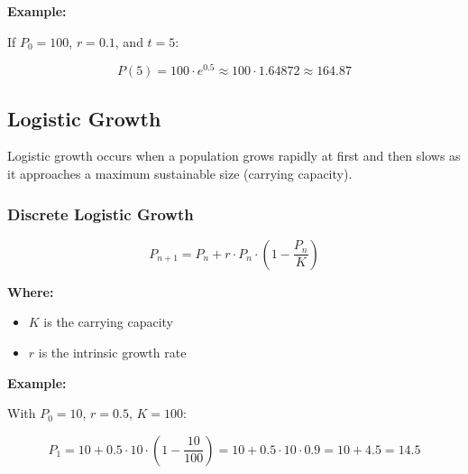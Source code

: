 \textbf{Example:}
\vspace{\baselineskip}
  
If \(P_0 = 100\), \(r = 0.1\), and \(t = 5\):

\[
P(5) = 100 \cdot e^{0.5} \approx 100 \cdot 1.64872 \approx 164.87
\]

\begin{center}
\end{center}

\subsection{Logistic Growth}

Logistic growth occurs when a population grows rapidly at first and then slows as it approaches a maximum sustainable size (carrying capacity).

\subsubsection{Discrete Logistic Growth}

\[
P_{n+1} = P_n + r \cdot P_n \cdot \left(1 - \frac{P_n}{K}\right)
\]

\textbf{Where:}
\begin{itemize}[label=\(-\)]
  \item \(K\) is the carrying capacity
  \item \(r\) is the intrinsic growth rate
\end{itemize}

\textbf{Example:}
\vspace{\baselineskip}
  
With \(P_0 = 10\), \(r = 0.5\), \(K = 100\):

\[
P_1 = 10 + 0.5 \cdot 10 \cdot \left(1 - \frac{10}{100}\right) = 10 + 0.5 \cdot 10 \cdot 0.9 = 10 + 4.5 = 14.5
\]

